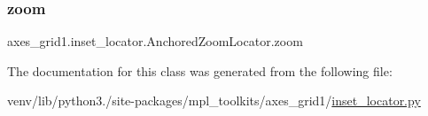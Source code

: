 \subsubsection{\texorpdfstring{zoom}{zoom}}
{\footnotesize\ttfamily axes\+\_\+grid1.\+inset\+\_\+locator.\+Anchored\+Zoom\+Locator.\+zoom}



The documentation for this class was generated from the following file\+:\begin{DoxyCompactItemize}
\item 
venv/lib/python3./site-\/packages/mpl\+\_\+toolkits/axes\+\_\+grid1/\hyperlink{_2inset__locator_8py}{inset\+\_\+locator.\+py}\end{DoxyCompactItemize}
